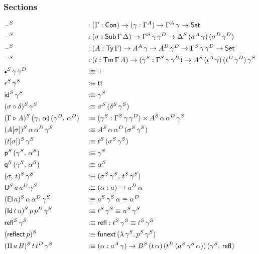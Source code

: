 \documentclass[12pt,a4paper,twoside,openany]{book}
\theoremstyle{remark}
\theoremstyle{definition}
\theoremstyle{theorem}
\newcommand{\ms}[1]{\mathsf{#1}}
\newcommand{\funext}{\ms{funext}}
\newcommand{\refl}{\mathsf{refl}}
\newcommand{\reflect}{\mathsf{reflect}}
\newcommand{\id}{\mathsf{id}}
\newcommand{\Con}{\mathsf{Con}}
\newcommand{\Sub}{\mathsf{Sub}}
\newcommand{\Tm}{\mathsf{Tm}}
\newcommand{\Ty}{\mathsf{Ty}}
\newcommand{\U}{\mathsf{U}}
\newcommand{\El}{\mathsf{El}}
\newcommand{\Id}{\mathsf{Id}}
\renewcommand{\tt}{\mathsf{tt}}
\newcommand{\blank}{\mathord{\hspace{1pt}\text{--}\hspace{1pt}}}
\newcommand{\Set}{\mathsf{Set}}
\newcommand{\ext}{\triangleright}
\newcommand{\emptycon}{\scaleobj{.75}\bullet}
\newcommand{\p}{\mathsf{p}}
\newcommand{\q}{\mathsf{q}}
\newcommand{\defn}{:\equiv}
\begin{document}
\subsubsection{Sections}

\begin{alignat*}{3}
  &\blank^S &&: (\Gamma : \Con) \to (\gamma : \Gamma^A) \to \Gamma^A\,\gamma \to \Set\\
  &\blank^S &&: (\sigma : \Sub\,\Gamma\,\Delta) \to \Gamma^S\,\gamma\,\gamma^D \to \Delta^S\,(\sigma^A\,\gamma)\,(\sigma^D\,\gamma^D)\\
  &\blank^S &&: (A : \Ty\,\Gamma) \to A^A\,\gamma \to A^D\,\gamma^D \to \Gamma^S\,\gamma\,\gamma^D \to \Set\\
  &\blank^S &&: (t : \Tm\,\Gamma\,A) \to (\gamma^S : \Gamma^S\,\gamma\,\gamma^D) \to A^S\,(t^A\,\gamma)\,(t^D\,\gamma^D)\,\gamma^S\\
  &\emptycon^S\,\gamma\,\gamma^D &&\defn \top \\
  &\epsilon^S\,\gamma^S &&\defn \tt\\
  &\id^S\,\gamma^S &&\defn \gamma^S\\
  &(\sigma \circ \delta)^S\,\gamma^S &&\defn \sigma^S\,(\delta^S\,\gamma^S)\\
  &(\Gamma \ext A)^S\,(\gamma,\,\alpha)\,(\gamma^D,\,\alpha^D) &&\defn
    (\gamma^S : \Gamma^S\,\gamma\,\gamma^D) \times A^S\,\alpha\,\alpha^D\,\gamma^S\\
  &(A[\sigma])^S\,\alpha\,\alpha^D\,\gamma^S &&\defn A^S\,\alpha\,\alpha^D\,(\sigma^S\,\gamma^S)\\
  &(t[\sigma])^S\,\gamma^S &&\defn t^S\,(\sigma^S\,\gamma^S)\\
  &\p^S\,(\gamma^S,\,\alpha^S) &&\defn \gamma^S\\
  &\q^S\,(\gamma^S,\,\alpha^S) &&\defn \alpha^S\\
  &(\sigma,\,t)^S\,\gamma^S &&\defn (\sigma^S\,\gamma^S,\,t^S\,\gamma^S)\\
  &\U^S\,a\,a^D\,\gamma^S &&\defn (\alpha : a) \to a^D\,\alpha\\
  &(\El\,a)^S\,\alpha\,\alpha^D\,\gamma^S &&\defn a^S\,\gamma^S\,\alpha \equiv \alpha^D \\
  &(\Id\,t\,u)^S\,p\,p^D\,\gamma^S &&\defn t^S\,\gamma^S \equiv u^S\,\gamma^S\\
  &\refl^S\,\gamma^S &&\defn \refl : t^S\,\gamma^S \equiv t^S\,\gamma^S\\
  &(\reflect\,p)^S &&\defn \funext\,(\lambda\,\gamma^S.\,p^S\,\gamma^S)\\
  &(\Pi\,a\,B)^S\,t\,t^D\,\gamma^S &&\defn (\alpha : a^A\,\gamma) \to B^S\,(t\,\alpha)\,(t^D\,(a^S\,\gamma^S\,\alpha))\,(\gamma^S,\,\refl)\\

\end{alignat*}
\end{document}
